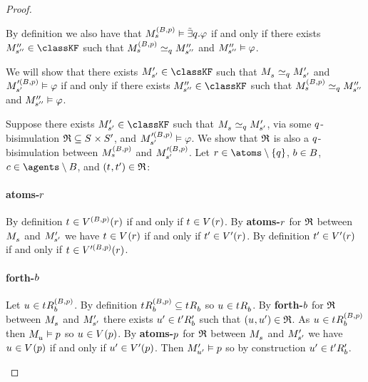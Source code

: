 \begin{proof}
\begin{description}
        By definition we also have that $\kPModel[(\agentsB, \atomP)]{\kStateS} \entails \somebisimsQ \phi$ if and only if there exists $\kPModelPP{\kStateSPP} \in \classKF$ such that $\kPModel[(\agentsB, \atomP)]{\kStateS} \bisimilar[\atomQ] \kPModelPP{\kStateSPP}$ and $\kPModelPP{\kStateSPP} \entails \phi$.

        We will show that there exists $\kPModelP{\kStateSP} \in \classKF$ such that $\kPModel{\kStateS} \bisimilar[\atomQ] \kPModelP{\kStateSP}$ and $\kPModel[\prime(\agentsB, \atomP)]{\kStateSP} \entails \phi$ if and only if there exists $\kPModelPP{\kStateSPP} \in \classKF$ such that $\kPModel[(\agentsB, \atomP)]{\kStateS} \bisimilar[\atomQ] \kPModelPP{\kStateSPP}$ and $\kPModelPP{\kStateSPP} \entails \phi$.

        Suppose there exists $\kPModelP{\kStateSP} \in \classKF$ such that $\kPModel{\kStateS} \bisimilar[\atomQ] \kPModelP{\kStateSP}$, via some $\atomQ$-bisimulation $\bisimulation \subseteq \kStates \times \kStatesP$, and $\kPModel[\prime(\agentsB, \atomP)]{\kStateSP} \entails \phi$.
        We show that $\bisimulation$ is also a $\atomQ$-bisimulation between $\kPModel[(\agentsB, \atomP)]{\kStateS}$ and $\kPModel[\prime(\agentsB, \atomP)]{\kStateSP}$.
        Let $\atomR \in \atoms \setminus \{\atomQ\}$, $\agentB \in \agentsB$, $\agentC \in \agents \setminus \agentsB$, and $(\kStateT, \kStateTP) \in \refinement$:

        \paragraph{atoms-$\atomR$}
        By definition $\kStateT \in \kValuation[(\agentsB, \atomP)](\atomR)$ if and only if $\kStateT \in \kValuation(\atomR)$.
        By {\bf atoms-$\atomR$} for $\bisimulation$ between $\kPModel{\kStateS}$ and $\kPModelP{\kStateSP}$ we have $\kStateT \in \kValuation(\atomR)$ if and only if $\kStateTP \in \kValuationP(\atomR)$.
        By definition $\kStateTP \in \kValuationP(\atomR)$ if and only if $\kStateT \in \kValuation[\prime(\agentsB, \atomP)](\atomR)$.

        \paragraph{forth-$\agentB$}
        Let $\kStateU \in \kSuccessorsB[(\agentsB, \atomP)]{\kStateT}$.
        By definition $\kSuccessorsB[(\agentsB, \atomP)]{\kStateT} \subseteq \kSuccessorsB{\kStateT}$ so $\kStateU \in \kSuccessorsB{\kStateT}$.
        By {\bf forth-$\agentB$} for $\bisimulation$ between $\kPModel{\kStateS}$ and $\kPModelP{\kStateSP}$ there exists $\kStateUP \in \kSuccessorsPB{\kStateTP}$ such that $(\kStateU, \kStateUP) \in \bisimulation$.
        As $\kStateU \in \kSuccessorsB[(\agentsB, \atomP)]{\kStateT}$ then $\kPModel{\kStateU} \entails \atomP$ so $\kStateU \in \kValuation(\atomP)$.
        By {\bf atoms-$\atomP$} for $\bisimulation$ between $\kPModel{\kStateS}$ and $\kPModelP{\kStateSP}$ we have $\kStateU \in \kValuation(\atomP)$ if and only if $\kStateUP \in \kValuationP(\atomP)$.
        Then $\kPModelP{\kStateUP} \entails \atomP$ so by construction $\kStateUP \in \kSuccessorsPB{\kStateTP}$.


\end{description}
\end{proof}
